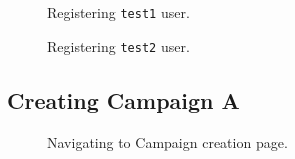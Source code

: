 \documentclass{article}
\begin{document}
		\begin{figure}[ht]
			\centering
			\caption{Registering \texttt{test1} user.}
			\label{fig:eval-prep-3}
		\end{figure}

		\begin{figure}[ht]
			\centering
			\caption{Registering \texttt{test2} user.}
			\label{fig:eval-prep-4}
		\end{figure}

		\FloatBarrier
		\subsection{Creating Campaign A}

		\begin{figure}[ht]
			\centering
			\caption{Navigating to Campaign creation page.}
			\label{fig:eval-ca-1}
		\end{figure}
\end{document}
